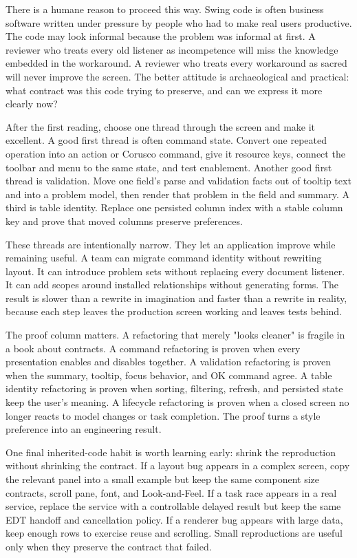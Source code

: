 There is a humane reason to proceed this way. Swing code is often business
software written under pressure by people who had to make real users productive.
The code may look informal because the problem was informal at first. A reviewer
who treats every old listener as incompetence will miss the knowledge embedded
in the workaround. A reviewer who treats every workaround as sacred will never
improve the screen. The better attitude is archaeological and practical: what
contract was this code trying to preserve, and can we express it more clearly
now?

After the first reading, choose one thread through the screen and make it
excellent. A good first thread is often command state. Convert one repeated
operation into an action or Corusco command, give it resource keys, connect the
toolbar and menu to the same state, and test enablement. Another good first
thread is validation. Move one field's parse and validation facts out of
tooltip text and into a problem model, then render that problem in the field and
summary. A third is table identity. Replace one persisted column index with a
stable column key and prove that moved columns preserve preferences.

These threads are intentionally narrow. They let an application improve while
remaining useful. A team can migrate command identity without rewriting layout.
It can introduce problem sets without replacing every document listener. It can
add scopes around installed relationships without generating forms. The result
is slower than a rewrite in imagination and faster than a rewrite in reality,
because each step leaves the production screen working and leaves tests behind.

The proof column matters. A refactoring that merely "looks cleaner" is fragile
in a book about contracts. A command refactoring is proven when every
presentation enables and disables together. A validation refactoring is proven
when the summary, tooltip, focus behavior, and OK command agree. A table
identity refactoring is proven when sorting, filtering, refresh, and persisted
state keep the user's meaning. A lifecycle refactoring is proven when a closed
screen no longer reacts to model changes or task completion. The proof turns a
style preference into an engineering result.

One final inherited-code habit is worth learning early: shrink the reproduction
without shrinking the contract. If a layout bug appears in a complex screen,
copy the relevant panel into a small example but keep the same component size
contracts, scroll pane, font, and Look-and-Feel. If a task race appears in a
real service, replace the service with a controllable delayed result but keep
the same EDT handoff and cancellation policy. If a renderer bug appears with
large data, keep enough rows to exercise reuse and scrolling. Small
reproductions are useful only when they preserve the contract that failed.

